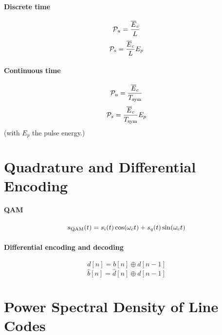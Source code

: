 \paragraph{Discrete time}
\begin{equation}
{\cal P}_u = \frac{\overline E_c}{L}
\label{eq:powerUpsampledSignal}
\end{equation}
\begin{equation}
{\cal P}_s = \frac{\overline E_c}{L} E_p
\label{eq:pamPowerDiscreteTime}
\end{equation}

\paragraph{Continuous time}
\begin{equation}
{\cal P}_u = \frac{\overline E_c}{{T_{\textrm{sym}}}}
\label{eq:powerUpsampledSignalContinuousTime}
\end{equation}
\begin{equation}
{\cal P}_s = \frac{\overline E_c}{{T_{\textrm{sym}}}} E_p
\label{eq:pamPowerContinuousTime}
\end{equation}
(with $E_p$ the pulse energy.)

\section*{Quadrature and Differential Encoding}

\paragraph{QAM}
\[
s_{\textrm{QAM}}(t) = s_i(t) \cos({\omega}_c t) + s_q(t) \sin({\omega}_c t)
\]

\paragraph{Differential encoding and decoding}
\begin{equation}
d[n] = b[n] \oplus d[n-1]
\label{eq:differential_encoding}
\end{equation}
\begin{equation}
\hat b[n] = \hat d[n] \oplus \hat d[n-1]
\label{eq:differential_decoding}
\end{equation}

\section*{Power Spectral Density of Line Codes}

